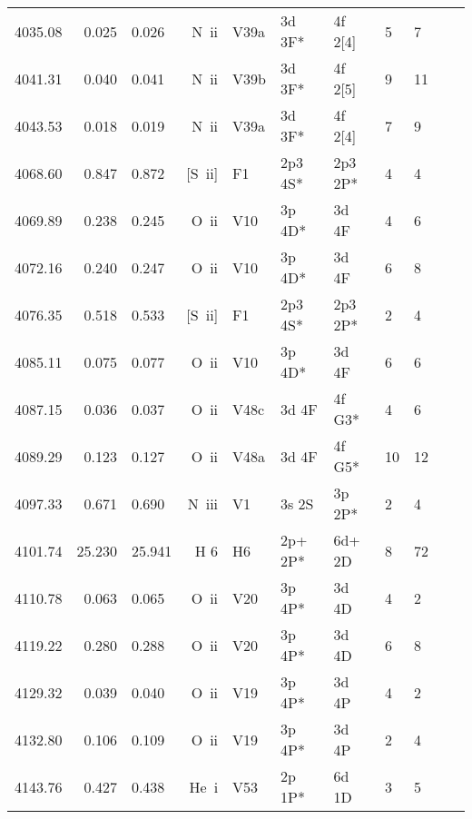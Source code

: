 \begin{longtable}{lrlrlllllll}
 4035.08 &   0.025 &   0.026 &  N~{\sc ii}      &  V39a      &  3d 3F*    &  4f 2[4]   &          5 &        7    \\
 4041.31 &   0.040 &   0.041 &  N~{\sc ii}      &  V39b      &  3d 3F*    &  4f 2[5]   &          9 &       11    \\
 4043.53 &   0.018 &   0.019 &  N~{\sc ii}      &  V39a      &  3d 3F*    &  4f 2[4]   &          7 &        9    \\
 4068.60 &   0.847 &   0.872 &  [S~{\sc ii}]    &  F1        &  2p3 4S*   &  2p3 2P*   &          4 &        4    \\
 4069.89 &   0.238 &   0.245 &  O~{\sc ii}      &  V10       &  3p 4D*    &  3d 4F     &          4 &        6    \\
 4072.16 &   0.240 &   0.247 &  O~{\sc ii}      &  V10       &  3p 4D*    &  3d 4F     &          6 &        8    \\
 4076.35 &   0.518 &   0.533 &  [S~{\sc ii}]    &  F1        &  2p3 4S*   &  2p3 2P*   &          2 &        4    \\
 4085.11 &   0.075 &   0.077 &  O~{\sc ii}      &  V10       &  3p 4D*    &  3d 4F     &          6 &        6    \\
 4087.15 &   0.036 &   0.037 &  O~{\sc ii}      &  V48c      &  3d 4F     &  4f G3*    &          4 &        6    \\
 4089.29 &   0.123 &   0.127 &  O~{\sc ii}      &  V48a      &  3d 4F     &  4f G5*    &         10 &       12    \\
 4097.33 &   0.671 &   0.690 &  N~{\sc iii}     &  V1        &  3s 2S     &  3p 2P*    &          2 &        4    \\
 4101.74 &  25.230 &  25.941 &  H 6       &  H6        &  2p+ 2P*   &  6d+ 2D    &          8 &       72          \\
 4110.78 &   0.063 &   0.065 &  O~{\sc ii}      &  V20       &  3p  4P*   &  3d  4D    &         4  &      2      \\
 4119.22 &   0.280 &   0.288 &  O~{\sc ii}      &  V20       &  3p 4P*    &  3d 4D     &          6 &        8    \\
 4129.32 &   0.039 &   0.040 &  O~{\sc ii}      &  V19       &  3p 4P*    &  3d 4P     &          4 &        2    \\
 4132.80 &   0.106 &   0.109 &  O~{\sc ii}      &  V19       &  3p 4P*    &  3d 4P     &          2 &        4    \\
 4143.76 &   0.427 &   0.438 &  He~{\sc i}      &  V53       &  2p 1P*    &  6d 1D     &          3 &        5    \\

\end{longtable}
